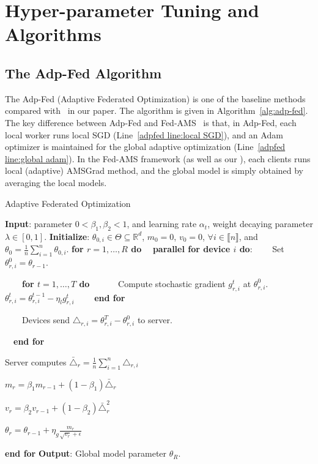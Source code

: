 \documentclass[manuscript,screen,review]{acmart}
\begin{document}
\section{Hyper-parameter Tuning and Algorithms} \label{app:experiment}


\subsection{The Adp-Fed Algorithm~\citep{reddi2020adaptive}}

The Adp-Fed (Adaptive Federated Optimization) is one of the baseline methods compared with \algo\ in our paper. The algorithm is given in Algorithm~\ref{alg:adp-fed}. The key difference between Adp-Fed and Fed-AMS~\citep{chen2020toward} is that, in Adp-Fed, each local worker runs local SGD (Line~\ref{adpfed line:local SGD}), and an Adam optimizer is maintained for the global adaptive optimization (Line~\ref{adpfed line:global adam}). In the Fed-AMS framework (as well as our \algo), each clients runs local (adaptive) AMSGrad method, and the global model is simply obtained by averaging the local models.


\begin{algorithm}[H]
\caption{Adaptive Federated Optimization~\citep{reddi2020adaptive}} \label{alg:adp-fed}
\begin{algorithmic}[1]
\STATE \textbf{Input}: parameter $0< \beta_1, \beta_2 <1$, and learning rate $\alpha_t$, weight decaying parameter $\lambda \in [0,1]$.
\STATE \textbf{Initialize}: $\theta_{0,i} \in \Theta \subseteq \mathbb R^d $, $m_0=0$, $v_{0} =0$, $\forall i\in \llbracket n\rrbracket$, and $\theta_0 =  \frac{1}{n} \sum_{i=1}^n \theta_{0,i}$.
\vspace{0.05in}
\STATE \textbf{for $r=1, \ldots, R$ do}
\STATE $\quad$\textbf{parallel for device $i$ do}:
\STATE $\qquad$Set $\theta_{r,i}^{0} = \theta_{r-1}$.

\STATE $\qquad$\textbf{for $t=1, \ldots, T$ do}
\STATE $\qquad\quad$Compute stochastic gradient $g^t_{r,i}$ at $\theta_{r,i}^{0}$.
\STATE $\qquad\quad$$\theta_{r,i}^t=\theta_{r,i}^{t-1}-\eta_l g_{r,i}^t$ \label{adpfed line:local SGD} 
\STATE $\qquad$\textbf{end for}


\STATE $\qquad$Devices send $\triangle_{r,i}=\theta_{r,i}^T-\theta_{r,i}^0$ to server.

\STATE $\quad$\textbf{end for}

\STATE \quad Server computes $\bar{\triangle}_r = \frac{1}{n}\sum_{i=1}^n \triangle_{r,i}$

\STATE \quad $m_r = \beta_1 m_{r-1} + (1-\beta_1)\bar{\triangle}_r$

\STATE \quad $v_r = \beta_2 v_{r-1} + (1-\beta_2)\bar{\triangle}_r^2$

\STATE \quad $\theta_r = \theta_{r-1}+\eta_g\frac{m_r}{\sqrt{v_r}+\epsilon}$ \label{adpfed line:global adam}

\STATE \textbf{end for}
\STATE \textbf{Output}: Global model parameter $\theta_R$.
\end{algorithmic}
\end{algorithm}
\end{document}
